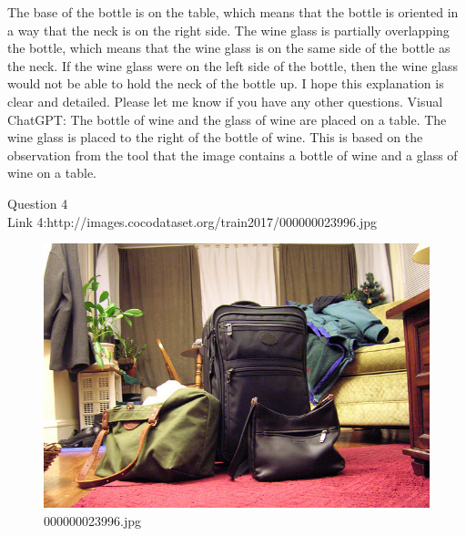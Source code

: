 \begin{enumerate}
        The base of the bottle is on the table, which means that the bottle is oriented in a way that the neck is on the right side.
        The wine glass is partially overlapping the bottle, which means that the wine glass is on the same side of the bottle as the neck.
        If the wine glass were on the left side of the bottle, then the wine glass would not be able to hold the neck of the bottle up.
        I hope this explanation is clear and detailed. Please let me know if you have any other questions.
        \subitem Visual ChatGPT: The bottle of wine and the glass of wine are placed on a table. The wine glass is placed to the right of the bottle of wine. This is based on the observation from the tool that the image contains a bottle of wine and a glass of wine on a table.
    \end{enumerate}
Question 4\\
Link 4:http://images.cocodataset.org/train2017/000000023996.jpg
    \begin{figure}[h]
        \centering
        \includegraphics[width=0.8\linewidth]{../image set/easy/000000023996.jpg}
        \caption{000000023996.jpg}
    \end{figure}
